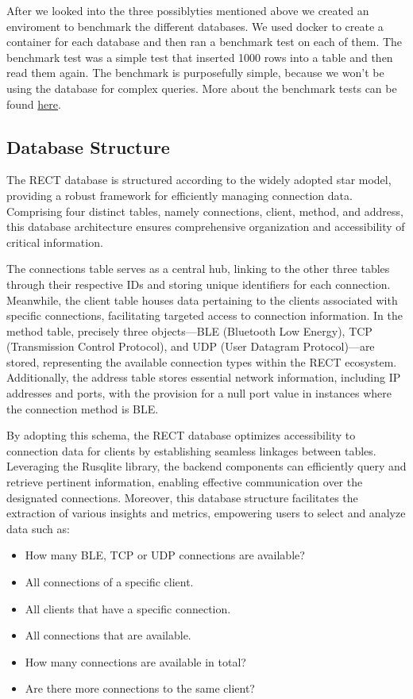 After we looked into the three possiblyties mentioned above we created an enviroment to benchmark the different databases. We used docker to create a container for each 
database and then ran a benchmark test on each of them. The benchmark test was a simple test that inserted 1000 rows into a table and then read them again. The benchmark is
purposefully simple, because we won't be using the database for complex queries. More about the benchmark tests can be found \href{tests.tex}{here}.

\subsection{Database Structure}
The RECT database is structured according to the widely adopted star model, providing a robust framework for efficiently managing connection data. Comprising four distinct 
tables, namely connections, client, method, and address, this database architecture ensures comprehensive organization and accessibility of critical information.\newline

The connections table serves as a central hub, linking to the other three tables through their respective IDs and storing unique identifiers for each connection. 
Meanwhile, the client table houses data pertaining to the clients associated with specific connections, facilitating targeted access to connection information. In the 
method table, precisely three objects—BLE (Bluetooth Low Energy), TCP (Transmission Control Protocol), and UDP (User Datagram Protocol)—are stored, representing the 
available connection types within the RECT ecosystem. Additionally, the address table stores essential network information, including IP addresses and ports, with the 
provision for a null port value in instances where the connection method is BLE.\newline

By adopting this schema, the RECT database optimizes accessibility to connection data for clients by establishing seamless linkages between tables. Leveraging the Rusqlite
library, the backend components can efficiently query and retrieve pertinent information, enabling effective communication over the designated connections. Moreover, this 
database structure facilitates the extraction of various insights and metrics, empowering users to select and analyze data such as:

\begin{itemize}
  \item[] How many BLE, TCP or UDP connections are available?
  \item[] All connections of a specific client.
  \item[] All clients that have a specific connection.
  \item[] All connections that are available.
  \item[] How many connections are available in total?
  \item[] Are there more connections to the same client?
\end{itemize}

